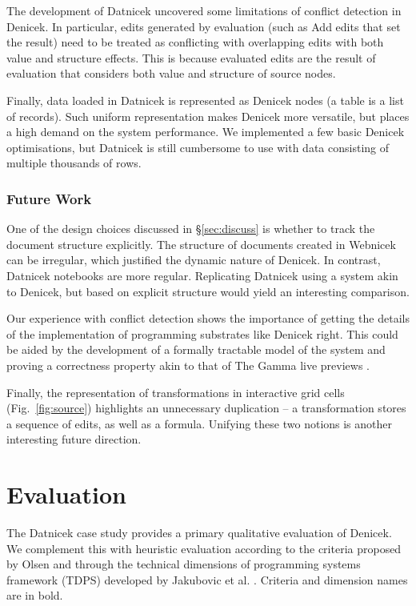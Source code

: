 \documentclass[sigconf]{acmart}
\newcommand{\ident}[1]{{\sffamily #1}}
\begin{document}
The development of Datnicek uncovered some limitations of conflict detection in Denicek.
In particular, edits generated by evaluation (such as \ident{Add} edits that set the
result) need to be treated as conflicting with overlapping edits with both value and structure
effects. This is because evaluated edits are the result of evaluation that considers both value
and structure of source nodes.

Finally, data loaded in Datnicek is represented as Denicek nodes (a table is a list of
records). Such uniform representation makes De\-ni\-cek more versatile, but places a high demand on the
system performance. We implemented a few basic Denicek optimisations, but Datnicek is still cumbersome
to use with data consisting of multiple thousands of rows.

\subsubsection*{Future Work}
One of the design choices discussed in \S\ref{sec:discuss} is whether to track the document
structure explicitly. The structure of documents created in Webnicek can be irregular,
which justified the dynamic nature of Denicek. In contrast, Datnicek notebooks are more regular.
Replicating Datnicek using a system akin to Denicek, but based on explicit structure would
yield an interesting comparison.

Our experience with conflict detection shows the importance of getting the details of the
implementation of programming substrates like Denicek right. This could be aided by the
development of a formally tractable model of the system and proving a correctness property
akin to that of The Gamma live previews \cite{petricek-2020-live}.

Finally, the representation of transformations in interactive grid cells (Fig.~\ref{fig:source})
highlights an unnecessary duplication -- a transformation stores a sequence of edits, as well as a formula.
Unifying these two notions is another interesting future direction.

\section{Evaluation}
\label{sec:eval}

The Datnicek case study provides a primary qualitative evaluation of Denicek. We complement this
with heuristic evaluation according to the criteria proposed by Olsen \cite{olsen-2007-evaluation}
and through the technical dimensions of programming systems framework (TDPS) developed by Jakubovic
et al. \cite{jakubovic-2023-techdims}. Criteria and dimension names are in bold.
\end{document}

